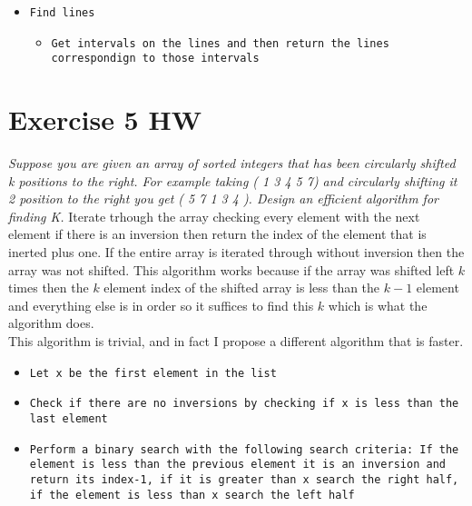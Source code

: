 \documentclass{amsart}
\begin{document}
{\begin{itemize}
\begin{itemize}
                \item \texttt{Get Intervals(Right partition)}
                \item \texttt{Merge intervals}
                \item \texttt{Return merged intervals}
            \end{itemize}
        \item \texttt{Find lines}
            \begin{itemize}
            \item \texttt{Get intervals on the lines and then return the lines correspondign to those intervals}
            \end{itemize}
    \end{itemize}
}


\section{Exercise 5 HW}
\emph{Suppose you are given an array of sorted integers that has been circularly shifted k positions to the right. For example taking ( 1 3 4 5 7) and circularly shifting it 2 position to the right you get ( 5 7 1 3 4 ). Design an efficient algorithm for finding K.}
Iterate trhough the array checking every element with the next element if there is an inversion then return the index of the element that is inerted plus one.
If the entire array is iterated through without inversion then the array was not shifted.
This algorithm works because if the array was shifted left $k$ times then the $k$ element index of the shifted array is
less than the $k-1$ element and everything else is in order so it suffices to find this $k$ which is what the algorithm does.\\
This algorithm is trivial, and in fact I propose a different algorithm that is faster.
{\small
    \begin{itemize}
        \item \texttt{Let x be the first element in the list}
        \item \texttt{Check if there are no inversions by checking if x is less than the last element}
        \item \texttt{Perform a binary search with the following search criteria: 
                If the element is less than the previous element it is an inversion and return its index-1, if it is greater than x search the right half,
            if the element is less than x search the left half}
    \end{itemize}
}
\end{document}
